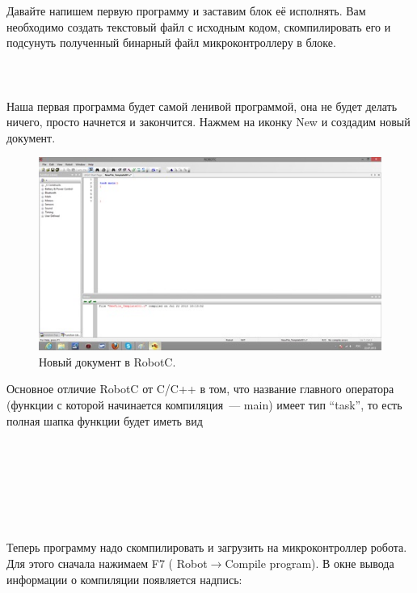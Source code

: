Давайте напишем первую программу и заставим блок её исполнять. Вам необходимо создать текстовый файл с исходным кодом, скомпилировать его и подсунуть полученный бинарный файл микроконтроллеру в блоке.\\\\

{\hypertarget{lesson9x6}{}}\\\\

Наша первая программа  будет самой ленивой программой, она не будет делать ничего, просто начнется и закончится. Нажмем на иконку  New  и создадим новый документ.

\begin{figure}[h!]
	\begin{center}
		\includegraphics[width=1\linewidth]{chapters/chapter9/images/3}
		\caption{Новый документ в RobotC.}
		\label{ris:image9x3}
	\end{center}
\end{figure}

Основное отличие RobotC от C/C++ в том, что название главного оператора (функции с которой начинается компиляция~--- main) имеет тип “task”, то есть полная шапка функции будет иметь вид\\\\

{\programm
	{\slshape{}}\rC{()}\\
	\rC{\{}\\\\
	\rC{\}}\\
}\\\\

Теперь программу надо скомпилировать и загрузить на микроконтроллер робота. Для этого сначала нажимаем F7 ( Robot\(\to\)Compile program). В окне вывода информации о компиляции  появляется надпись:

